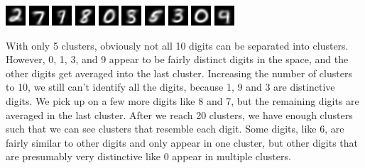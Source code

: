\documentclass{article}
\begin{document}
\begin{mdframed}
\includegraphics[]{images/mnist-20-clusters/10.png} \includegraphics[]{images/mnist-20-clusters/11.png} \includegraphics[]{images/mnist-20-clusters/12.png} \includegraphics[]{images/mnist-20-clusters/13.png} \includegraphics[]{images/mnist-20-clusters/14.png} \includegraphics[]{images/mnist-20-clusters/15.png} \includegraphics[]{images/mnist-20-clusters/16.png} \includegraphics[]{images/mnist-20-clusters/17.png} \includegraphics[]{images/mnist-20-clusters/18.png} \includegraphics[]{images/mnist-20-clusters/19.png}
\end{mdframed}

With only 5 clusters, obviously not all 10 digits can be separated into clusters. However, 0, 1, 3, and 9 appear to be fairly distinct digits in the space, and the other digits get averaged into the last cluster. Increasing the number of clusters to 10, we still can't identify all the digits, because 1, 9 and 3 are distinctive digits. We pick up on a few more digits like 8 and 7, but the remaining digits are averaged in the last cluster. After we reach 20 clusters, we have enough clusters such that we can see clusters that resemble each digit. Some digits, like 6, are fairly similar to other digits and only appear in one cluster, but other digits that are presumably very distinctive like 0 appear in multiple clusters.
\end{document}
